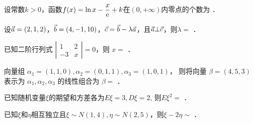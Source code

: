 \documentclass{jnuexam}
\begin{document}
\bigskip

\newpagea %



\newpageb %

\begin{problem}
设常数$k>0$，函数$f(x)=\ln x-\dfrac{x}{\mathrm{e}}+k$在$(0,+\infty)$内零点的个数为 ．
\end{problem}

\vfill

\begin{problem}
设$\vec{a}=(2,1,2)$，$\vec{b}=(4,-1,10)$，$\vec{c}=\vec{b}-\lambda\vec{a}$，且$\vec{a}\bot\vec{c}$，则$\lambda=$ ．
\end{problem}

\vfill

\begin{problem}
已知二阶行列式 $\left|\begin{array}{cc}
    1   & 2 \\
    - 3 & x
  \end{array}\right|=0$，则 $x=$ ．
\end{problem}

\vfill

\begin{problem}
向量组 $\alpha_1=(1,1,0), \alpha_2=(0,1,1), \alpha_3=(1,0,1)$，
则将向量 $\beta=(4, 5, 3)$ 表示为 $\alpha_1, \alpha_2, \alpha_3$
的线性组合为 $\beta=$ ．
\end{problem}

\vfill

\begin{problem}
已知随机变量$\xi$的期望和方差各为$E\xi=3, D\xi=2$, 则$E\xi^2=$ ．
\end{problem}

\vfill

\begin{problem}
已知$\xi$和$\eta$相互独立且$\xi\sim N(1,4), \eta\sim N(2,5)$，则$\xi-2\eta\sim$ ．
\end{problem}

\vfill

\newpagea %




\newpageb %
\end{document}

